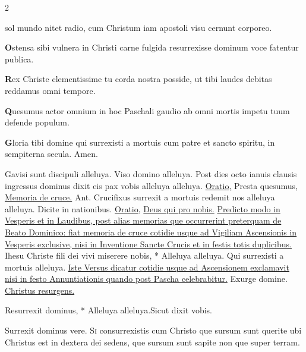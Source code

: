\begin{multicols*}{2}
{sol mundo nitet radio,
cum Christum iam apostoli
visu cernunt corporeo.
\par {\bfseries \color{Red} O}stensa sibi vulnera
in Christi carne fulgida
resurrexisse dominum
voce fatentur publica.
\par {\bfseries \color{Blue} R}ex Christe clementissime
tu corda nostra posside,
ut tibi laudes debitas
reddamus omni tempore.
\par {\bfseries \color{Red} Q}uesumus actor omnium
in hoc Paschali gaudio
ab omni mortis impetu
tuum defende populum.
\par {\bfseries \color{Blue} G}loria tibi domine
qui surrexisti a mortuis
cum patre et sancto spiritu,
in sempiterna secula. Amen.
}
\newline \V Gavisi sunt discipuli alleluya. \R Viso domino alleluya.
 Post dies octo ianuis clausis ingressus dominus dixit eis pax vobis alleluya alleluya. \ul{Oratio,} Presta quesumus, \ul{Memoria de cruce.} {\color{Red} Ant.} Crucifixus surrexit a mortuis redemit nos alleluya alleluya. \V Dicite in nationibus. \ul{Oratio,} \hyperlink{deus-qui-pro-cruce}{Deus qui pro nobis.}
\newline \ul{Predicto modo in Vesperis et in Laudibus, post alias memorias que occurrerint preterquam de Beato Dominico: fiat memoria de cruce cotidie usque ad Vigiliam Ascensionis in Vesperis exclusive, nisi in Inventione Sancte Crucis et in festis totis duplicibus.}
 \R Ihesu Christe fili dei vivi miserere nobis, * Alleluya alleluya. \V Qui surrexisti a mortuis alleluya.
\newline \ul{Iste Versus dicatur cotidie usque ad Ascensionem exclamavit nisi in festo Annuntiationis quando post Pascha celebrabitur.}
\newline \V Exurge domine.
 \hyperlink{christus-resurgens-capitulum}{Christus resurgens.}
\begin{responsory-breve}
{Resurrexit dominus, * Alleluya alleluya.}{Sicut dixit vobis.}
\end{responsory-breve}%
\V Surrexit dominus vere.
\lettrine[lines=2]{\zallmancaps \color{Blue} S}{i} consurrexistis cum Christo que sursum sunt querite ubi Christus est in dextera dei sedens, que sursum sunt sapite non que super terram.

\end{multicols*}
